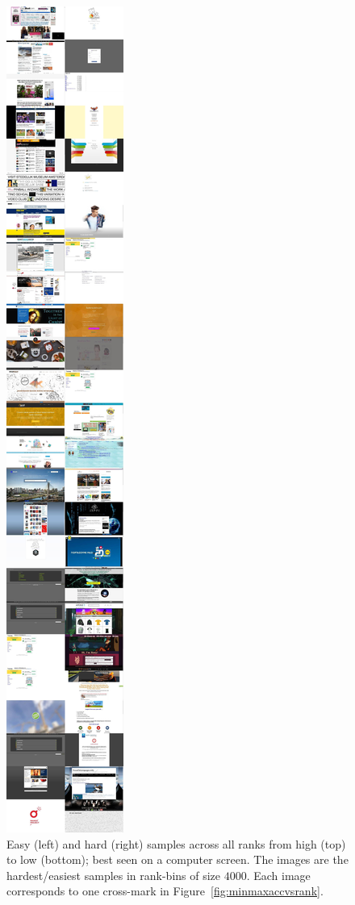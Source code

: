 \begin{figure}
    \centering
    \includegraphics[height=.85\textheight]{resources/hard-easy.jpg}
    \caption[Easy and hard samples across all ranks]{Easy (left) and hard (right) samples across all ranks from high (top) to low (bottom); best seen on a computer screen. The images are the hardest/easiest samples in rank-bins of size $4000$. Each image corresponds to one cross-mark in Figure~\ref{fig:minmaxaccvsrank}.}\label{fig:hardandeasysamples}
\end{figure}

